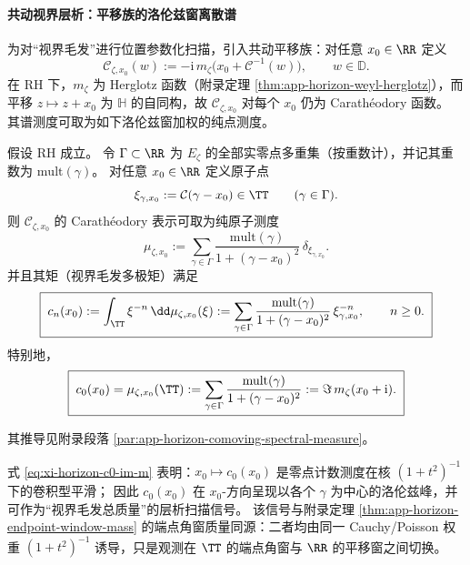 \paragraph{共动视界层析：平移族的洛伦兹窗离散谱}
为对“视界毛发”进行位置参数化扫描，引入共动平移族：对任意 \(x_0\in\RR\) 定义
\begin{equation}\label{eq:xi-horizon-comoving-carath-def}
\boxed{\;
\mathscr{C}_{\zeta,x_0}(w):=-\mathrm{i}\,m_{\zeta}\!\bigl(x_0+\mathcal{C}^{-1}(w)\bigr),
\qquad w\in\mathbb{D}.
\;}
\end{equation}
在 RH 下，\(m_{\zeta}\) 为 Herglotz 函数（附录定理 \ref{thm:app-horizon-weyl-herglotz}），而平移 \(z\mapsto z+x_0\) 为 \(\mathbb{H}\) 的自同构，故 \(\mathscr{C}_{\zeta,x_0}\) 对每个 \(x_0\) 仍为 Carath\'eodory 函数。
其谱测度可取为如下洛伦兹窗加权的纯点测度。

\begin{theorem}[共动视界层析的离散谱测度与矩恒等式]\label{thm:xi-horizon-comoving-spectral-measure}
假设 RH 成立。
令 \(\Gamma\subset\RR\) 为 \(E_{\zeta}\) 的全部实零点多重集（按重数计），并记其重数为 \(\mathrm{mult}(\gamma)\)。
对任意 \(x_0\in\RR\) 定义原子点
\[
  \xi_{\gamma,x_0}:=\mathcal{C}(\gamma-x_0)\in\TT\qquad(\gamma\in\Gamma).
\]
则 \(\mathscr{C}_{\zeta,x_0}\) 的 Carath\'eodory 表示可取为纯原子测度
\begin{equation}\label{eq:xi-horizon-mu-comoving}
\boxed{\;
\mu_{\zeta,x_0}
:=
\sum_{\gamma\in\Gamma}\frac{\mathrm{mult}(\gamma)}{1+(\gamma-x_0)^2}\,\delta_{\xi_{\gamma,x_0}}.
\;}
\end{equation}
并且其矩（视界毛发多极矩）满足
\begin{equation}\label{eq:xi-horizon-moment-comoving}
\boxed{\;
c_n(x_0):=\int_{\TT}\xi^{-n}\,\dd\mu_{\zeta,x_0}(\xi)
:=\sum_{\gamma\in\Gamma}\frac{\mathrm{mult}(\gamma)}{1+(\gamma-x_0)^2}\,\xi_{\gamma,x_0}^{-n},
\qquad n\ge 0.
\;}
\end{equation}
特别地，
\begin{equation}\label{eq:xi-horizon-c0-im-m}
\boxed{\;
c_0(x_0)=\mu_{\zeta,x_0}(\TT)
:=\sum_{\gamma\in\Gamma}\frac{\mathrm{mult}(\gamma)}{1+(\gamma-x_0)^2}
:=\Im\,m_{\zeta}(x_0+\mathrm{i}).\;}
\end{equation}
\end{theorem}
\noindent
其推导见附录段落 \ref{par:app-horizon-comoving-spectral-measure}。

\begin{remark}[洛伦兹窗平滑与层析语义]\label{rem:xi-horizon-lorentz-tomography}
式 \eqref{eq:xi-horizon-c0-im-m} 表明：\(x_0\mapsto c_0(x_0)\) 是零点计数测度在核 \((1+t^2)^{-1}\) 下的卷积型平滑；
因此 \(c_0(x_0)\) 在 \(x_0\)-方向呈现以各个 \(\gamma\) 为中心的洛伦兹峰，并可作为“视界毛发总质量”的层析扫描信号。
该信号与附录定理 \ref{thm:app-horizon-endpoint-window-mass} 的端点角窗质量同源：二者均由同一 Cauchy/Poisson 权重 \((1+t^2)^{-1}\) 诱导，只是观测在 \(\TT\) 的端点角窗与 \(\RR\) 的平移窗之间切换。
\end{remark}

